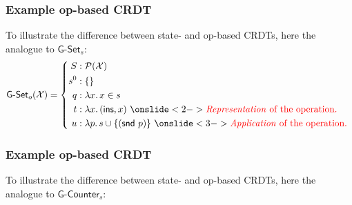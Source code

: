 \documentclass[aspectratio=169,compress,handout]{beamer}
\newcommand*{\CRDT}{\textsf{CRDT}\xspace}
\newcommand*{\CRDTs}{\textsf{CRDTs}\xspace}
\begin{document}
  \begin{frame}
    \frametitle{Example op-based \CRDT}

    To illustrate the difference between state- and op-based \CRDTs, here the
    analogue to $\textsf{G-Set}_s$:
    \[
      \textsf{G-Set}_o(\mathcal{X}) = \left\{\begin{aligned}
        S &: \mathcal{P}(\mathcal{X}) \\
        s^0 &: \{ \} \\
        q &: \lambda x.\, x \in s \\
        t &: \lambda x.\, (\textsf{ins}, x)~\onslide<2->{\text{%
          \color{red}
          \emph{Representation} of the operation.
        }} \\
        u &: \lambda p.\, s \cup \{(\textsf{snd}~p)\}~\onslide<3->{\text{%
          \color{red}
          \emph{Application} of the operation.
        }} \\
      \end{aligned}\right.
    \]
  \end{frame}

  \begin{frame}
    \frametitle{Example op-based \CRDT}

    To illustrate the difference between state- and op-based \CRDTs, here the
    analogue to $\textsf{G-Counter}_s$:
    \begin{columns}
      \begin{column}{.5\textwidth}
      \end{column}
      \begin{column}{.5\textwidth}
      \end{column}
    \end{columns}
  \end{frame}
\end{document}
